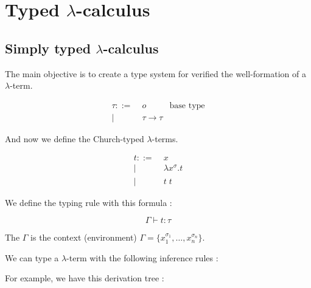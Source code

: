 \section{Typed $\lambda$-calculus}

  \subsection{Simply typed $\lambda$-calculus}

  The main objective is to create a type system for verified the
  well-formation of a $\lambda$-term.

  \begin{align*}
    \tau ::=&\; o & \text{base type} \\
        |&\; \tau \to \tau
  \end{align*}

  And now we define the Church-typed $\lambda$-terms.
  
  \begin{align*}
    t ::=&\; x \\
      |&\; \lambda x^\sigma. t \\
      |&\; t\;t
  \end{align*}

  We define the typing rule with this formula :

  $$\Gamma \vdash t : \tau$$

  The $\Gamma$ is the context (environment) $\Gamma = \{x_1^{\sigma_1}, \ldots,
  x_n^{\sigma_n}\}$.

  We can type a $\lambda$-term with the following inference rules :


  For example, we have this derivation tree :

